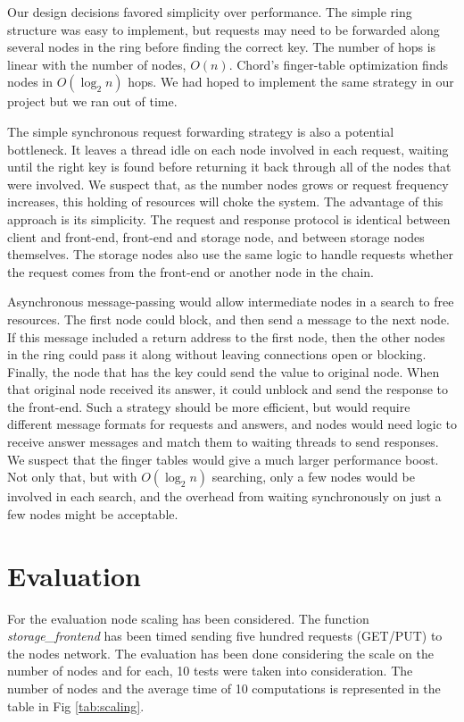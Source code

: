 \documentclass[11pt,conference]{IEEEtran}
\begin{document}
Our design decisions favored simplicity over performance. The simple ring
structure was easy to implement, but requests may need to be forwarded along
several nodes in the ring before finding the correct key. The number of hops is
linear with the number of nodes, $O(n)$. Chord's finger-table
optimization\cite{chord} finds nodes in $O(\log_2 n)$ hops. We had hoped to
implement the same strategy in our project but we ran out of time.

The simple synchronous request forwarding strategy is also a potential
bottleneck. It leaves a thread idle on each node involved in each request,
waiting until the right key is found before returning it back through all of the
nodes that were involved. We suspect that, as the number nodes grows or request
frequency increases, this holding of resources will choke the system. The
advantage of this approach is its simplicity. The request and response protocol
is identical between client and front-end, front-end and storage node, and
between storage nodes themselves. The storage nodes also use the same logic to
handle requests whether the request comes from the front-end or another node in
the chain.

Asynchronous message-passing would allow intermediate nodes in a search to free
resources. The first node could block, and then send a message to the next node.
If this message included a return address to the first node, then the other
nodes in the ring could pass it along without leaving connections open or
blocking. Finally, the node that has the key could send the value to original
node. When that original node received its answer, it could unblock and send the
response to the front-end. Such a strategy should be more efficient, but would
require different message formats for requests and answers, and nodes would need
logic to receive answer messages and match them to waiting threads to send
responses. We suspect that the finger tables would give a much larger
performance boost. Not only that, but with $O(\log_2 n)$ searching, only a few
nodes would be involved in each search, and the overhead from waiting
synchronously on just a few nodes might be acceptable.


\section{Evaluation}
For the evaluation node scaling has been considered. The function \textit{storage\_frontend} has been timed sending five hundred requests (GET/PUT) to the nodes network. The evaluation has been done considering the scale on the number of nodes and for each, 10 tests were taken into consideration.
\newline
The number of nodes and the average time of 10 computations is represented in the table in Fig \ref{tab:scaling}.
\end{document}
